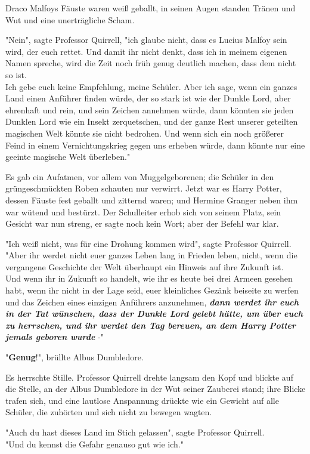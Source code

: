 {Draco Malfoys Fäuste waren weiß geballt, in seinen Augen standen Tränen und Wut und eine unerträgliche Scham.

"Nein", sagte Professor Quirrell, "ich glaube nicht, dass es Lucius Malfoy sein wird, der euch rettet. Und damit ihr nicht denkt, dass ich in meinem eigenen Namen spreche, wird die Zeit noch früh genug deutlich machen, dass dem nicht so ist.\\ Ich gebe euch keine Empfehlung, meine Schüler. Aber ich sage, wenn ein ganzes Land einen Anführer finden würde, der so stark ist wie der Dunkle Lord, aber ehrenhaft und rein, und sein Zeichen annehmen würde, dann könnten sie jeden Dunklen Lord wie ein Insekt zerquetschen, und der ganze Rest unserer geteilten magischen Welt könnte sie nicht bedrohen. Und wenn sich ein noch größerer Feind in einem Vernichtungskrieg gegen uns erheben würde, dann könnte nur eine geeinte magische Welt überleben."

Es gab ein Aufatmen, vor allem von Muggelgeborenen; die Schüler in den grüngeschmückten Roben schauten nur verwirrt. Jetzt war es Harry Potter, dessen Fäuste fest geballt und zitternd waren; und Hermine Granger neben ihm war wütend und bestürzt. Der Schulleiter erhob sich von seinem Platz, sein Gesicht war nun streng, er sagte noch kein Wort; aber der Befehl war klar.

"Ich weiß nicht, was für eine Drohung kommen wird", sagte Professor Quirrell.\\ "Aber ihr werdet nicht euer ganzes Leben lang in Frieden leben, nicht, wenn die vergangene Geschichte der Welt überhaupt ein Hinweis auf ihre Zukunft ist.\\ Und wenn ihr in Zukunft so handelt, wie ihr es heute bei drei Armeen gesehen habt, wenn ihr nicht in der Lage seid, euer kleinliches Gezänk beiseite zu werfen und das Zeichen eines einzigen Anführers anzunehmen, \textbf{\emph{dann werdet ihr euch in der Tat wünschen, dass der Dunkle Lord gelebt hätte, um über euch zu herrschen, und ihr werdet den Tag bereuen, an dem Harry Potter jemals geboren wurde}} -"

"\textbf{Genug}!", brüllte Albus Dumbledore.

Es herrschte Stille. Professor Quirrell drehte langsam den Kopf und blickte auf die Stelle, an der Albus Dumbledore in der Wut seiner Zauberei stand; ihre Blicke trafen sich, und eine lautlose Anspannung drückte wie ein Gewicht auf alle Schüler, die zuhörten und sich nicht zu bewegen wagten.

"Auch du hast dieses Land im Stich gelassen", sagte Professor Quirrell.\\ "Und du kennst die Gefahr genauso gut wie ich."

}
